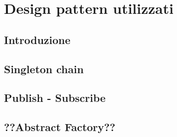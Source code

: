 \newpage
\section{Design pattern utilizzati}

\subsection{Introduzione}

\subsection{Singleton chain}

\subsection{Publish - Subscribe}


\subsection{??Abstract Factory??}

